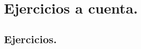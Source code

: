 \documentclass[12pt]{article}
\numberwithin{equation}{section}
\begin{document}

\section{Ejercicios a cuenta.}
\subsection{Ejercicios.}
\end{document}
